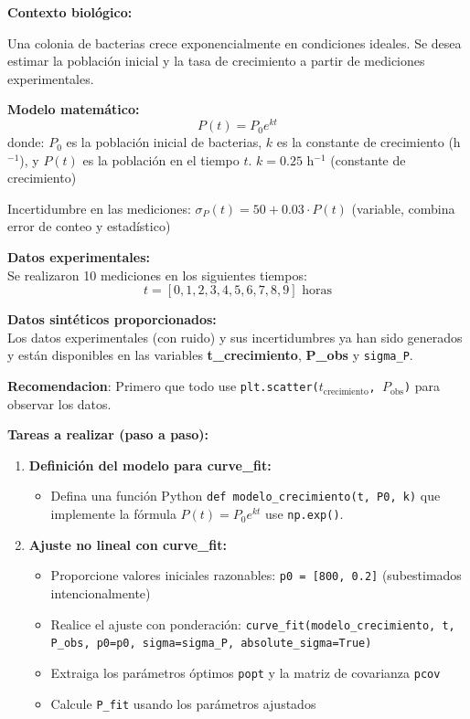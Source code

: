\documentclass[10pt]{article}
\begin{document}
\begin{tcolorbox}[title={Pregunta 3 – Crecimiento Bacteriano (scipy.optimize.curve\_fit)}]

\noindent\textbf{Contexto biológico:}

Una colonia de bacterias crece exponencialmente en condiciones ideales. Se desea estimar la población inicial y la tasa de crecimiento a partir de mediciones experimentales.

\noindent\textbf{Modelo matemático:}
\[
P(t) = P_0 e^{kt}
\]
donde: $P_0$ es la población inicial de bacterias, $k$ es la constante de crecimiento (h$^{-1}$), y $P(t)$ es la población en el tiempo $t$.
$k = 0.25$ h$^{-1}$ (constante de crecimiento)

Incertidumbre en las mediciones: $\sigma_P(t) = 50 + 0.03 \cdot P(t)$ (variable, combina error de conteo y estadístico)


\noindent\textbf{Datos experimentales:}\\
Se realizaron 10 mediciones en los siguientes tiempos:
\[
 t = [0, 1, 2, 3, 4, 5, 6, 7, 8, 9] \text{ horas}
\]

\noindent\textbf{Datos sintéticos proporcionados:}\\[0.3em]
Los datos experimentales (con ruido) y sus incertidumbres ya han sido generados y están disponibles en las variables \textbf{t\_crecimiento}, \textbf{P\_obs} y \texttt{sigma\_P}.

\noindent\textbf{Recomendacion}: Primero que todo use \texttt{plt.scatter($t_{\text{crecimiento}}$, $P_{\text{obs}}$)} para observar los datos.

\noindent\textbf{Tareas a realizar (paso a paso):}

\begin{enumerate}
  \item \textbf{Definición del modelo para curve\_fit:}
  \begin{itemize}
    \item Defina una función Python \texttt{def modelo\_crecimiento(t, P0, k)} que implemente la fórmula $P(t) = P_0 e^{kt}$ use \texttt{np.exp()}.
  \end{itemize}
  
  \item \textbf{Ajuste no lineal con curve\_fit:}
  \begin{itemize}
    \item Proporcione valores iniciales razonables: \texttt{p0 = [800, 0.2]} (subestimados intencionalmente)
    \item Realice el ajuste con ponderación: \texttt{curve\_fit(modelo\_crecimiento, t, P\_obs, p0=p0, sigma=sigma\_P, absolute\_sigma=True)}
    \item Extraiga los parámetros óptimos \texttt{popt} y la matriz de covarianza \texttt{pcov}
    \item Calcule \texttt{P\_fit} usando los parámetros ajustados
  \end{itemize}
  

\end{enumerate}
\end{tcolorbox}
\end{document}
